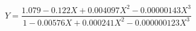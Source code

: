 

\[
Y = \frac{1.079 - 0.122X + 0.004097X^{2} - 0.00000143X^{3}} {1 - 0.00576X + 0.000241X^{2} - 0.000000123X^{3}}
\]


